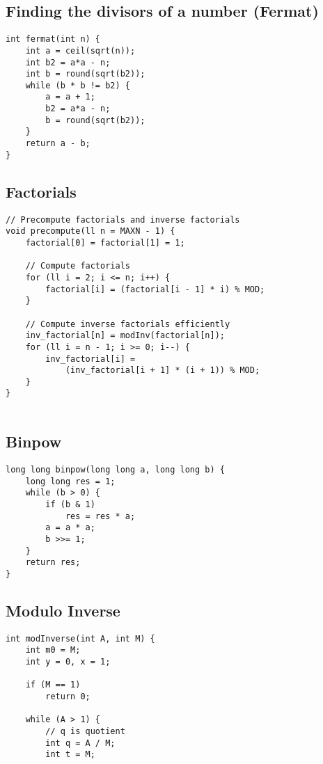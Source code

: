 \documentclass[10pt]{article}
\begin{document}
\begin{multicols*}{2}
\subsection{Finding the divisors of a number (Fermat)}
\begin{lstlisting}[style=compactcpp]
int fermat(int n) {
    int a = ceil(sqrt(n));
    int b2 = a*a - n;
    int b = round(sqrt(b2));
    while (b * b != b2) {
        a = a + 1;
        b2 = a*a - n;
        b = round(sqrt(b2));
    }
    return a - b;
}
\end{lstlisting}


\subsection{Factorials}

\begin{lstlisting}
// Precompute factorials and inverse factorials
void precompute(ll n = MAXN - 1) {
    factorial[0] = factorial[1] = 1;
    
    // Compute factorials
    for (ll i = 2; i <= n; i++) {
        factorial[i] = (factorial[i - 1] * i) % MOD;
    }
    
    // Compute inverse factorials efficiently
    inv_factorial[n] = modInv(factorial[n]);
    for (ll i = n - 1; i >= 0; i--) {
        inv_factorial[i] = 
            (inv_factorial[i + 1] * (i + 1)) % MOD;
    }
}
 
\end{lstlisting}

\subsection{Binpow}
\begin{lstlisting}[style=compactcpp]
long long binpow(long long a, long long b) {
    long long res = 1;
    while (b > 0) {
        if (b & 1)
            res = res * a;
        a = a * a;
        b >>= 1;
    }
    return res;
}
\end{lstlisting}
\subsection{Modulo Inverse}
\begin{lstlisting}[style=compactcpp]
int modInverse(int A, int M) {
    int m0 = M;
    int y = 0, x = 1;

    if (M == 1)
        return 0;

    while (A > 1) {
        // q is quotient
        int q = A / M;
        int t = M;


\end{lstlisting}
\end{multicols*}
\end{document}
